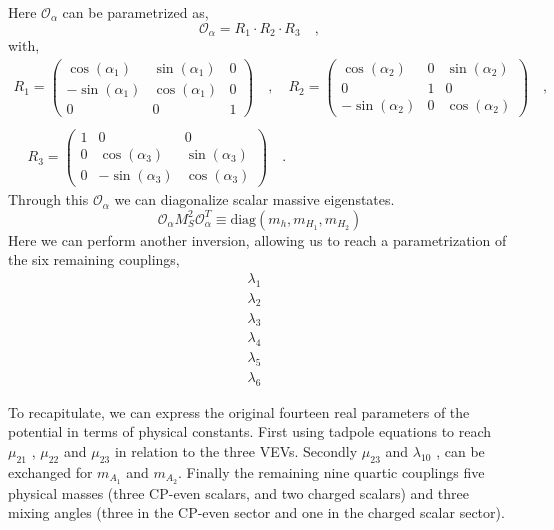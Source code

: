 Here $\mathcal{O}_\alpha$ can be parametrized as, 
\begin{equation}
\mathcal{O}_\alpha = R_1 \cdot R_2 \cdot R_3 \quad , 
\end{equation}
with, 
\begin{gather}
R_1 = \begin{pmatrix}
\cos(\alpha_1) & \sin(\alpha_1) & 0 \\
-\sin(\alpha_1) & \cos(\alpha_1) & 0 \\ 
0 & 0 & 1 
\end{pmatrix} \quad , \quad R_2 = \begin{pmatrix}
\cos(\alpha_2) & 0 & \sin(\alpha_2) \\ 
0 & 1 & 0 \\
-\sin(\alpha_2) & 0 & \cos(\alpha_2) 
\end{pmatrix} \quad ,\\ \\ \quad R_3 = \begin{pmatrix}
1 & 0 & 0 \\
0 & \cos(\alpha_3 ) & \sin(\alpha_3) \\
0 & -\sin(\alpha_3) & \cos(\alpha_3) 
\end{pmatrix} \quad . 
\end{gather}
Through this $\mathcal{O}_\alpha$ we can diagonalize scalar massive eigenstates. 
\begin{equation}
\mathcal{O}_\alpha M^2_S \mathcal{O}_\alpha^T \equiv \text{diag}(m_h,m_{H_1},m_{H_2})
\end{equation}
Here we can perform another inversion, allowing us to reach a parametrization of the six remaining couplings, 
\begin{equation}
\begin{split}
\lambda_1 & \\ 
\lambda_2 & \\ 
\lambda_3 & \\ 
\lambda_4 & \\ 
\lambda_5 & \\ 
\lambda_6 & 
\end{split} 
\end{equation}

To recapitulate, we can express the original fourteen real parameters of the potential in terms of physical constants. First using tadpole equations to reach $\mu_{21}$ , $\mu_{22}$ and $\mu_{23}$ in relation to the three VEVs. Secondly $\mu_{23}$ and $\lambda_10$ , can be exchanged for $m_{A_1}$ and $m_{A_2}$. Finally the remaining nine quartic couplings five physical masses (three CP-even scalars, and two charged scalars) and three mixing angles (three in the CP-even sector and one in the charged scalar sector).

